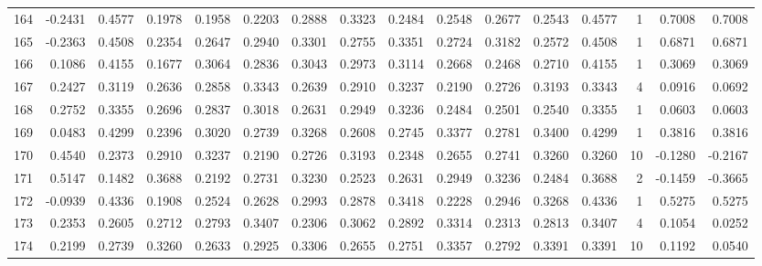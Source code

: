 \begin{tabular}{lrrrrrrrrrrrrrrr}
164 &     -0.2431 &  0.4577 &  0.1978 &  0.1958 &  0.2203 &  0.2888 &  0.3323 &  0.2484 &  0.2548 &  0.2677 &   0.2543 &     0.4577 &      1 &                    0.7008 &                     0.7008 \\
165 &     -0.2363 &  0.4508 &  0.2354 &  0.2647 &  0.2940 &  0.3301 &  0.2755 &  0.3351 &  0.2724 &  0.3182 &   0.2572 &     0.4508 &      1 &                    0.6871 &                     0.6871 \\
166 &      0.1086 &  0.4155 &  0.1677 &  0.3064 &  0.2836 &  0.3043 &  0.2973 &  0.3114 &  0.2668 &  0.2468 &   0.2710 &     0.4155 &      1 &                    0.3069 &                     0.3069 \\
167 &      0.2427 &  0.3119 &  0.2636 &  0.2858 &  0.3343 &  0.2639 &  0.2910 &  0.3237 &  0.2190 &  0.2726 &   0.3193 &     0.3343 &      4 &                    0.0916 &                     0.0692 \\
168 &      0.2752 &  0.3355 &  0.2696 &  0.2837 &  0.3018 &  0.2631 &  0.2949 &  0.3236 &  0.2484 &  0.2501 &   0.2540 &     0.3355 &      1 &                    0.0603 &                     0.0603 \\
169 &      0.0483 &  0.4299 &  0.2396 &  0.3020 &  0.2739 &  0.3268 &  0.2608 &  0.2745 &  0.3377 &  0.2781 &   0.3400 &     0.4299 &      1 &                    0.3816 &                     0.3816 \\
170 &      0.4540 &  0.2373 &  0.2910 &  0.3237 &  0.2190 &  0.2726 &  0.3193 &  0.2348 &  0.2655 &  0.2741 &   0.3260 &     0.3260 &     10 &                   -0.1280 &                    -0.2167 \\
171 &      0.5147 &  0.1482 &  0.3688 &  0.2192 &  0.2731 &  0.3230 &  0.2523 &  0.2631 &  0.2949 &  0.3236 &   0.2484 &     0.3688 &      2 &                   -0.1459 &                    -0.3665 \\
172 &     -0.0939 &  0.4336 &  0.1908 &  0.2524 &  0.2628 &  0.2993 &  0.2878 &  0.3418 &  0.2228 &  0.2946 &   0.3268 &     0.4336 &      1 &                    0.5275 &                     0.5275 \\
173 &      0.2353 &  0.2605 &  0.2712 &  0.2793 &  0.3407 &  0.2306 &  0.3062 &  0.2892 &  0.3314 &  0.2313 &   0.2813 &     0.3407 &      4 &                    0.1054 &                     0.0252 \\
174 &      0.2199 &  0.2739 &  0.3260 &  0.2633 &  0.2925 &  0.3306 &  0.2655 &  0.2751 &  0.3357 &  0.2792 &   0.3391 &     0.3391 &     10 &                    0.1192 &                     0.0540 \\

\end{tabular}
